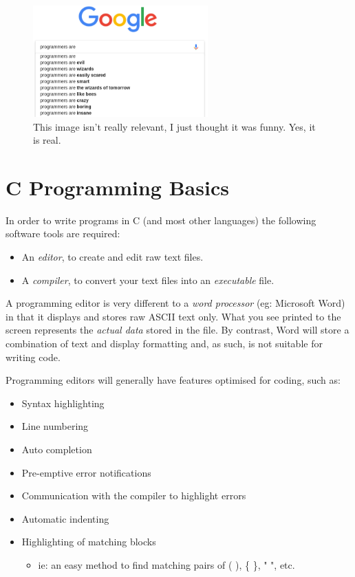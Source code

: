 \documentclass{lab}
\begin{document}
\begin{figure}[H]
\begin{center}
\includegraphics[width=0.6\textwidth]{Wk1Images/google.png}
\end{center}
\caption{This image isn't really relevant, I just thought it was funny. Yes, it is real.}
\end{figure}

\pagebreak
\tableofcontents

\pagebreak
\section{C Programming Basics}
In order to write programs in C (and most other languages) the following software tools are required:

\begin{itemize}
\item An \textit{editor}, to create and edit raw text files.
\item A \textit{compiler}, to convert your text files into an \textit{executable} file.
\end{itemize}

A programming editor is very different to a \textit{word processor} (eg: Microsoft Word) in that it displays and stores raw ASCII text only. What you see printed to the screen represents the \textit{actual data} stored in the file. By contrast, Word will store a combination of text and display formatting and, as such, is not suitable for writing code.

Programming editors will generally have features optimised for coding, such as:

\begin{itemize}
\item Syntax highlighting
\item Line numbering
\item Auto completion
\item Pre-emptive error notifications
\item Communication with the compiler to highlight errors
\item Automatic indenting
\item Highlighting of matching blocks 
	\begin{itemize}
		\item ie: an easy method to find matching pairs of ( ), \{ \}, " ", etc.
	\end{itemize}
\end{itemize}
\end{document}

